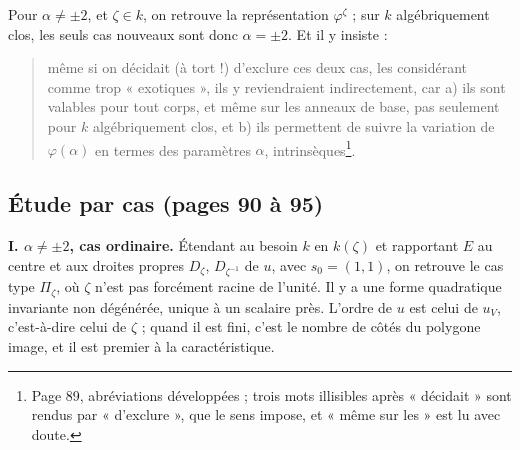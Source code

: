 \documentclass[11pt,a4paper]{article}
\begin{document}
Pour $\alpha \neq \pm 2$, et $\zeta \in k$, on retrouve la représentation
$\varphi^\zeta$ ; sur $k$ algébriquement clos, les seuls cas nouveaux sont donc
$\alpha = \pm 2$. Et il y insiste :
\begin{quote}
même si on décidait (à tort !) d'exclure ces deux cas, les considérant comme
trop « exotiques », ils y reviendraient indirectement, car a) ils sont
valables pour tout corps, et même sur les anneaux de base, pas seulement pour
$k$ algébriquement clos, et b) ils permettent de suivre la variation de
$\varphi(\alpha)$ en termes des paramètres $\alpha$,
intrinsèques\footnote{Page 89, abréviations développées ; trois mots
illisibles après « décidait » sont rendus par « d'exclure », que le sens
impose, et « même sur les » est lu avec doute.}.
\end{quote}

\subsection*{Étude par cas (pages 90 à 95)}

\textbf{I. $\alpha \neq \pm 2$, cas ordinaire.} Étendant au besoin $k$ en
$k(\zeta)$ et rapportant $E$ au centre et aux droites propres $D_\zeta$,
$D_{\zeta^{-1}}$ de $u$, avec $s_0 = (1,1)$, on retrouve le cas type
$\Pi_\zeta$, où $\zeta$ n'est pas forcément racine de l'unité. Il y a une forme
quadratique invariante non dégénérée, unique à un scalaire près. L'ordre de
$u$ est celui de $u_V$, c'est-à-dire celui de $\zeta$ ; quand il est fini,
c'est le nombre de côtés du polygone image, et il est premier à la
caractéristique.
\end{document}
